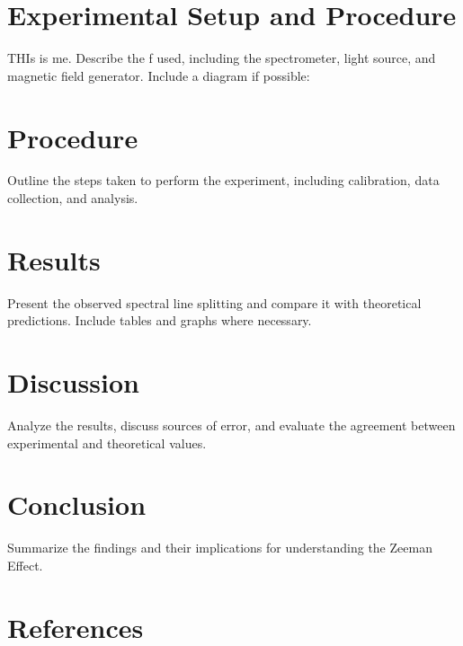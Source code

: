 \documentclass[a4paper,12pt]{article}
\begin{document}
\section{Experimental Setup and Procedure}
THIs is me.
Describe the f used, including the spectrometer, light source, and magnetic field generator. Include a diagram if possible:

\section{Procedure}
Outline the steps taken to perform the experiment, including calibration, data collection, and analysis.

\section{Results}
Present the observed spectral line splitting and compare it with theoretical predictions. Include tables and graphs where necessary.

\section{Discussion}
Analyze the results, discuss sources of error, and evaluate the agreement between experimental and theoretical values.

\section{Conclusion}
Summarize the findings and their implications for understanding the Zeeman Effect.

\section*{References}
\printbibliography
\end{document}
